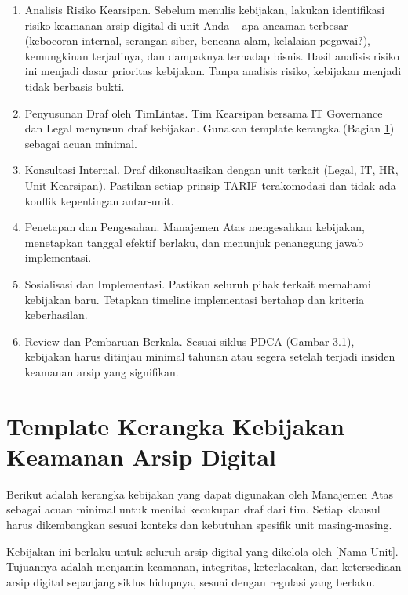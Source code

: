 \documentclass[12pt,a4paper]{report}
\begin{document}
\begin{enumerate}[leftmargin=*]
    \item Analisis Risiko Kearsipan. Sebelum menulis kebijakan, lakukan identifikasi risiko keamanan arsip digital di unit Anda -- apa ancaman terbesar (kebocoran internal, serangan siber, bencana alam, kelalaian pegawai?), kemungkinan terjadinya, dan dampaknya terhadap bisnis. Hasil analisis risiko ini menjadi dasar prioritas kebijakan. Tanpa analisis risiko, kebijakan menjadi tidak berbasis bukti.
    \item Penyusunan Draf oleh TimLintas. Tim Kearsipan bersama IT Governance dan Legal menyusun draf kebijakan. Gunakan template kerangka (Bagian \ref{sec:template-kebijakan}) sebagai acuan minimal.
    \item Konsultasi Internal. Draf dikonsultasikan dengan unit terkait (Legal, IT, HR, Unit Kearsipan). Pastikan setiap prinsip TARIF terakomodasi dan tidak ada konflik kepentingan antar-unit.
    \item Penetapan dan Pengesahan. Manajemen Atas mengesahkan kebijakan, menetapkan tanggal efektif berlaku, dan menunjuk penanggung jawab implementasi.
    \item Sosialisasi dan Implementasi. Pastikan seluruh pihak terkait memahami kebijakan baru. Tetapkan timeline implementasi bertahap dan kriteria keberhasilan.
    \item Review dan Pembaruan Berkala. Sesuai siklus PDCA (Gambar 3.1), kebijakan harus ditinjau minimal tahunan atau segera setelah terjadi insiden keamanan arsip yang signifikan.
\end{enumerate}


\section{Template Kerangka Kebijakan Keamanan Arsip Digital}
\label{sec:template-kebijakan}
Berikut adalah kerangka kebijakan yang dapat digunakan oleh Manajemen Atas sebagai acuan minimal untuk menilai kecukupan draf dari tim. Setiap klausul harus dikembangkan sesuai konteks dan kebutuhan spesifik unit masing-masing.

\begin{plnbox}
Kebijakan ini berlaku untuk seluruh arsip digital yang dikelola oleh [Nama Unit]. Tujuannya adalah menjamin keamanan, integritas, keterlacakan, dan ketersediaan arsip digital sepanjang siklus hidupnya, sesuai dengan regulasi yang berlaku.
\end{plnbox}
\end{document}
